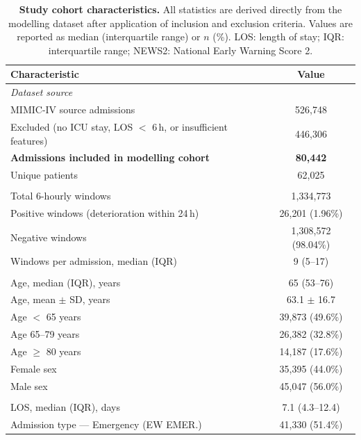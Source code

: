 \begin{table}[H]
\centering
\caption{\textbf{Study cohort characteristics.}
All statistics are derived directly from the modelling dataset after
application of inclusion and exclusion criteria.
Values are reported as median (interquartile range) or $n$ (\%).
LOS: length of stay; IQR: interquartile range; NEWS2: National Early Warning Score 2.}
\label{tab:cohort}
\begin{tabular}{lc}
\toprule
\textbf{Characteristic} & \textbf{Value} \\
\midrule
\multicolumn{2}{l}{\textit{Dataset source}} \\
\quad MIMIC-IV source admissions & 526,748 \\
\quad Excluded (no ICU stay, LOS $<$ 6\,h, or insufficient features) & 446,306 \\
\quad \textbf{Admissions included in modelling cohort} & \textbf{80,442} \\
\quad Unique patients & 62,025 \\
\addlinespace
\multicolumn{2}{l}{\textit{Monitoring windows}} \\
\quad Total 6-hourly windows & 1,334,773 \\
\quad Positive windows (deterioration within 24\,h) & 26,201 (1.96\%) \\
\quad Negative windows & 1,308,572 (98.04\%) \\
\quad Windows per admission, median (IQR) & 9 (5--17) \\
\addlinespace
\multicolumn{2}{l}{\textit{Demographics}} \\
\quad Age, median (IQR), years & 65 (53--76) \\
\quad Age, mean $\pm$ SD, years & 63.1 $\pm$ 16.7 \\
\quad Age $<$ 65 years & 39,873 (49.6\%) \\
\quad Age 65--79 years & 26,382 (32.8\%) \\
\quad Age $\geq$ 80 years & 14,187 (17.6\%) \\
\quad Female sex & 35,395 (44.0\%) \\
\quad Male sex & 45,047 (56.0\%) \\
\addlinespace
\multicolumn{2}{l}{\textit{Clinical characteristics}} \\
\quad LOS, median (IQR), days & 7.1 (4.3--12.4) \\
\quad Admission type --- Emergency (EW EMER.) & 41,330 (51.4\%) \\

\end{tabular}
\end{table}
